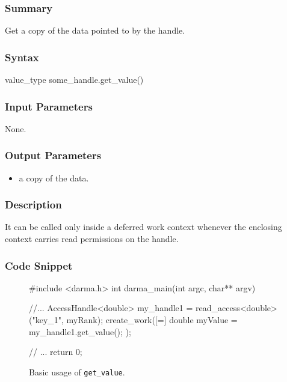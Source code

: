 \hspace{0.1cm} %
\begin{subs}
\vspace{-1.2cm}

\subsubsection{Summary} 
Get a copy of the data pointed to by the handle.

\subsubsection{Syntax} 
\begin{CppCode}
value_type some_handle.get_value()
\end{CppCode}

\subsubsection{Input Parameters} 
None.

\subsubsection{Output Parameters} 
\begin{itemize}
\item a copy of the data.  
\end{itemize}

\subsubsection{Description} 
It can be called only inside a deferred work context whenever 
the enclosing context carries read permissions on the handle.


\subsubsection{Code Snippet} 
\begin{figure}[!h]
\begin{CppCodeNumb}
#include <darma.h>
int darma_main(int argc, char** argv)
{
	//...
  AccessHandle<double> my_handle1 = read_access<double>("key_1", myRank);
  create_work([=]{
  	double myValue = my_handle1.get_value();
  });

  // ... 
  return 0;
}
\end{CppCodeNumb}
\label{fig:fe_api_initialaccess}
\caption{Basic usage of \texttt{get\_value}.}
\end{figure}

\end{subs}






